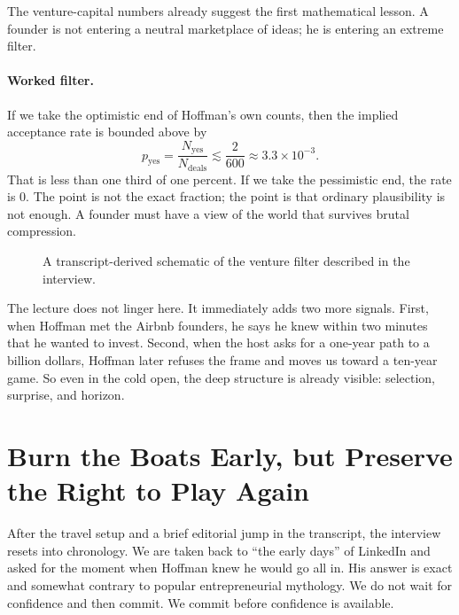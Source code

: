 The venture-capital numbers already suggest the first mathematical lesson. A founder is not entering a neutral marketplace of ideas; he is entering an extreme filter.

\paragraph{Worked filter.}
If we take the optimistic end of Hoffman's own counts, then the implied acceptance rate is bounded above by
\begin{equation}
p_{\mathrm{yes}}=\frac{N_{\mathrm{yes}}}{N_{\mathrm{deals}}}\lesssim \frac{2}{600}\approx 3.3\times 10^{-3}.
\end{equation}
That is less than one third of one percent. If we take the pessimistic end, the rate is \(0\). The point is not the exact fraction; the point is that ordinary plausibility is not enough. A founder must have a view of the world that survives brutal compression.

\begin{figure}
\begin{center}

{\small A transcript-derived schematic of the venture filter described in the interview.}
\end{center}
\end{figure}

The lecture does not linger here. It immediately adds two more signals. First, when Hoffman met the Airbnb founders, he says he knew within two minutes that he wanted to invest. Second, when the host asks for a one-year path to a billion dollars, Hoffman later refuses the frame and moves us toward a ten-year game. So even in the cold open, the deep structure is already visible: selection, surprise, and horizon.

\section{Burn the Boats Early, but Preserve the Right to Play Again}

After the travel setup and a brief editorial jump in the transcript, the interview resets into chronology. We are taken back to ``the early days'' of LinkedIn and asked for the moment when Hoffman knew he would go all in. His answer is exact and somewhat contrary to popular entrepreneurial mythology. We do not wait for confidence and then commit. We commit before confidence is available.


